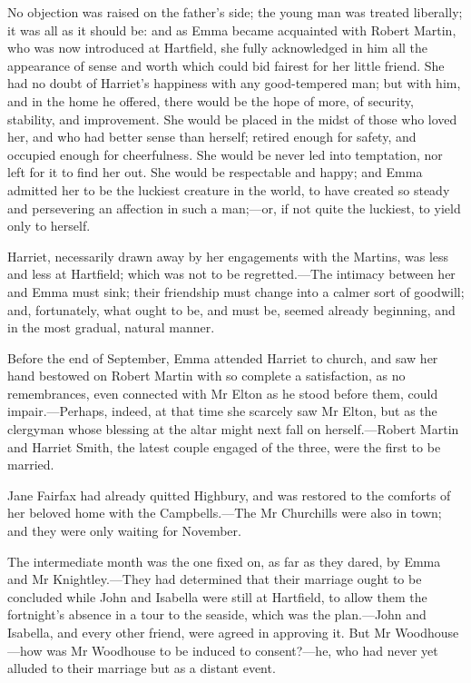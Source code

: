 No objection was raised on the father's side; the young man was treated liberally; it was all as it should be: and as Emma became acquainted with Robert Martin, who was now introduced at Hartfield, she fully acknowledged in him all the appearance of sense and worth which could bid fairest for her little friend. She had no doubt of Harriet's happiness with any good-tempered man; but with him, and in the home he offered, there would be the hope of more, of security, stability, and improvement. She would be placed in the midst of those who loved her, and who had better sense than herself; retired enough for safety, and occupied enough for cheerfulness. She would be never led into temptation, nor left for it to find her out. She would be respectable and happy; and Emma admitted her to be the luckiest creature in the world, to have created so steady and persevering an affection in such a man;—or, if not quite the luckiest, to yield only to herself.

Harriet, necessarily drawn away by her engagements with the Martins, was less and less at Hartfield; which was not to be regretted.—The intimacy between her and Emma must sink; their friendship must change into a calmer sort of goodwill; and, fortunately, what ought to be, and must be, seemed already beginning, and in the most gradual, natural manner.

Before the end of September, Emma attended Harriet to church, and saw her hand bestowed on Robert Martin with so complete a satisfaction, as no remembrances, even connected with Mr Elton as he stood before them, could impair.—Perhaps, indeed, at that time she scarcely saw Mr Elton, but as the clergyman whose blessing at the altar might next fall on herself.—Robert Martin and Harriet Smith, the latest couple engaged of the three, were the first to be married.

Jane Fairfax had already quitted Highbury, and was restored to the comforts of her beloved home with the Campbells.—The Mr Churchills were also in town; and they were only waiting for November.

The intermediate month was the one fixed on, as far as they dared, by Emma and Mr Knightley.—They had determined that their marriage ought to be concluded while John and Isabella were still at Hartfield, to allow them the fortnight's absence in a tour to the seaside, which was the plan.—John and Isabella, and every other friend, were agreed in approving it. But Mr Woodhouse—how was Mr Woodhouse to be induced to consent?—he, who had never yet alluded to their marriage but as a distant event.

